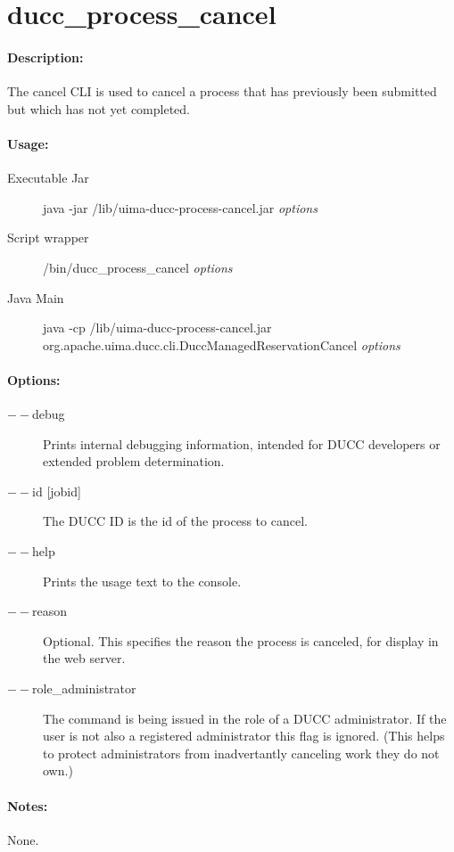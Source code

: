 \ifpdf
\else
{}
\fi
    \section{ducc\_process\_cancel}

    \paragraph{Description:}
    The cancel CLI is used to cancel a process that has previously been submitted but which has not yet 
    completed. 

    \paragraph{Usage:}
    \begin{description}
    \item[Executable Jar] java -jar \ducchome/lib/uima-ducc-process-cancel.jar {\em options}
    \item[Script wrapper] \ducchome/bin/ducc\_process\_cancel {\em options}
    \item[Java Main]      java -cp \ducchome/lib/uima-ducc-process-cancel.jar org.apache.uima.ducc.cli.DuccManagedReservationCancel {\em options}
    \end{description}

    \paragraph{Options:}
    \begin{description}
        \item[$--$debug ]          
          Prints internal debugging information, intended for DUCC developers or extended problem determination.          
        \item[$--$id {[jobid]}]
          The DUCC ID is the id of the process to cancel.
        \item[$--$help]
          Prints the usage text to the console.
        \item[$--$reason]
          Optional. This specifies the reason the process is canceled, for display in the web server. 
        \item[$--$role\_administrator] The command is being issued in the role of a DUCC administrator.
          If the user is not also a registered administrator this flag is ignored.  (This helps to
          protect administrators from inadvertantly canceling work they do not own.)
     \end{description}
        
    \paragraph{Notes:}
    None.

